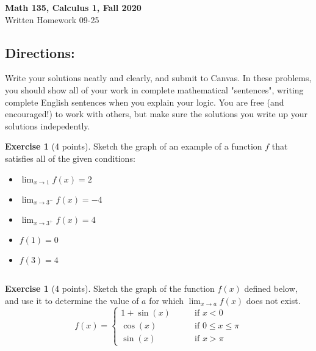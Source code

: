 \documentclass[11pt,reqno,final]{amsart}
\numberwithin{equation}{section}
\numberwithin{figure}{section}
\theoremstyle{definition} %
\newtheorem{exercise}[question]{Exercise}
\begin{document}
\begin{center}
        \textbf{\Large Math 135, Calculus 1, Fall 2020}\\[10pt]
        {\large Written Homework 09-25}
\end{center}

\thispagestyle{empty}

\renewcommand{\thesection}{\Alph{section}}

\subsection*{Directions:}
Write your solutions neatly and clearly, and submit to Canvas.
In these problems, you should show all of your work in complete mathematical "sentences", writing complete English sentences when you explain your logic.
You are free (and encouraged!) to work with others, but make sure the solutions you write up your solutions indepedently.

\begin{exercise}[4 points]
        Sketch the graph of an example of a function $f$ that satisfies all of the given conditions:
        \begin{itemize}\itemsep+10pt
        \item $\displaystyle\lim_{x \to 1} f(x) = 2$
        \item $\displaystyle\lim_{x \to 3^-} f(x) = -4$
        \item $\displaystyle\lim_{x \to 3^+} f(x) = 4$
        \item $f(1) = 0$
        \item $f(3) = 4$
        \end{itemize}
\end{exercise}

$ $

\begin{exercise}[4 points]
        Sketch the graph of the function $f(x)$ defined below, and use it to determine the value of $a$ for which
        $\displaystyle\lim_{x \to a} f(x)$ does not exist.
        \[
                f(x) =
                \begin{cases}
                        1 + \sin(x) \qquad & \mbox{if $x < 0$}\\
                        \cos(x) & \mbox{if $0 \leq x \leq \pi$}\\
                        \sin(x) & \mbox{if $x>\pi$}                        
                \end{cases}
        \]
\end{exercise}
\end{document}
